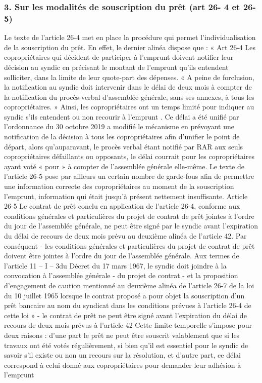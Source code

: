 		\subsubsection{3. Sur les modalités de souscription du prêt (art 26- 4 et 26-5)}
		
			Le texte de l'article 26-4 met en place la procédure qui permet l'individualisation de la souscription du prêt. En effet, le dernier alinéa dispose que :
			« Art 26-4
			Les copropriétaires qui décident de participer à l’emprunt doivent notifier leur décision au syndic en précisant le montant de l’emprunt qu’ils entendent solliciter, dans la limite de leur quote-part des dépenses. « A peine de forclusion, la notification au syndic doit intervenir dans le délai de deux mois à compter de la notification du procès-verbal d'assemblée générale, sans ses annexes, à tous les copropriétaires. »
			Ainsi, les copropriétaires ont un temps limité pour indiquer au syndic s'ils entendent ou non recourir à l’emprunt .
			Ce délai a été unifié par l’ordonnance du 30 octobre 2019 a modifié le mécanisme en prévoyant une notification de la décision à tous les copropriétaires afin d’unifier le point de
			départ, alors qu’auparavant, le procès verbal étant notifié par RAR aux seuls copropriétaires défaillants ou opposants, le délai courrait pour les copropriétaires ayant voté « pour » à compter de l’assemblée générale elle-même.
			Le texte de l'article 26-5 pose par ailleurs un certain nombre de garde-fous afin de permettre une information correcte des copropriétaires au moment de la souscription l'emprunt, information qui était jusqu'à présent nettement insuffisante.
			Article 26-5
			Le contrat de prêt conclu en application de l'article 26-4, conforme aux conditions générales et particulières du projet de contrat de prêt jointes à l'ordre du jour de l'assemblée générale, ne peut être signé par le syndic avant l'expiration du délai de recours de deux mois prévu au deuxième alinéa de l'article 42.
			Par conséquent
			- les conditions générales et particulières du projet de contrat de prêt doivent être jointes à l'ordre du jour de l'assemblée générale.
			Aux termes de l’article 11 – I – 3\degres du Décret du 17 mars 1967, le syndic doit joindre à la convocation à l’assemblée générale
			- du projet de contrat
			- et la proposition d'engagement de caution mentionné au deuxième alinéa de l'article 26-7 de la loi du 10 juillet 1965 lorsque le contrat proposé a pour objet la souscription d'un prêt bancaire au nom du syndicat dans les conditions prévues à l'article 26-4 de cette loi »
			- le contrat de prêt ne peut être signé avant l'expiration du délai de recours de deux mois prévus à l'article 42
			Cette limite temporelle s'impose pour deux raisons : d'une part le prêt ne peut être souscrit valablement que si les travaux ont été votés régulièrement, si bien qu'il est essentiel pour le syndic de savoir s'il existe ou non un recours sur la résolution, et d'autre part, ce délai correspond à celui donné aux copropriétaires pour demander leur adhésion à l’emprunt
		
